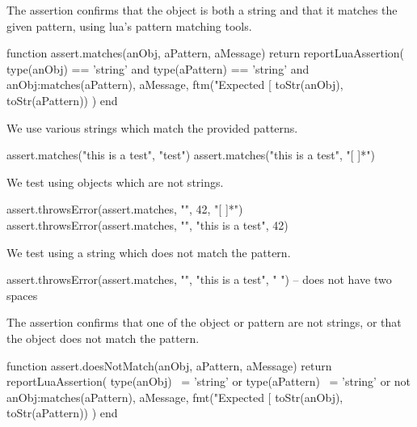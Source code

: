 \stopTestSuite


The  assertion confirms that the object is both a 
string and that it matches the given pattern, using lua's pattern matching 
tools. 

\startLuaCode
function assert.matches(anObj, aPattern, aMessage)
  return reportLuaAssertion(
    type(anObj) == 'string' and type(aPattern) == 'string' 
    and anObj:matches(aPattern),
    aMessage,
    ftm("Expected [%
      toStr(anObj), toStr(aPattern))
  )
end
\stopLuaCode


We use various strings which match the provided patterns. 

\startLuaTest
  assert.matches("this is a test", "test")
  assert.matches("this is a test", "[ ]*")
\stopLuaTest
\stopTestCase


We test using objects which are not strings.

\startLuaTest
  assert.throwsError(assert.matches, "", 42, "[ ]*")
  assert.throwsError(assert.matches, "",
    "this is a test", 42)
\stopLuaTest
\stopTestCase


We test using a string which does not match the pattern.

\startLuaTest
  assert.throwsError(assert.matches, "", 
    "this is a test", "  ") -- does not have two spaces
\stopLuaTest
\stopTestCase

\stopTestSuite


The  assertion confirms that one of the object 
or pattern are not strings, or that the object does not match the pattern. 

\startLuaCode
function assert.doesNotMatch(anObj, aPattern, aMessage)
  return reportLuaAssertion(
    type(anObj) ~= 'string' or type(aPattern) ~= 'string' 
    or not anObj:matches(aPattern),
    aMessage,
    fmt("Expected [%
      toStr(anObj), toStr(aPattern))
  )
end
\stopLuaCode


